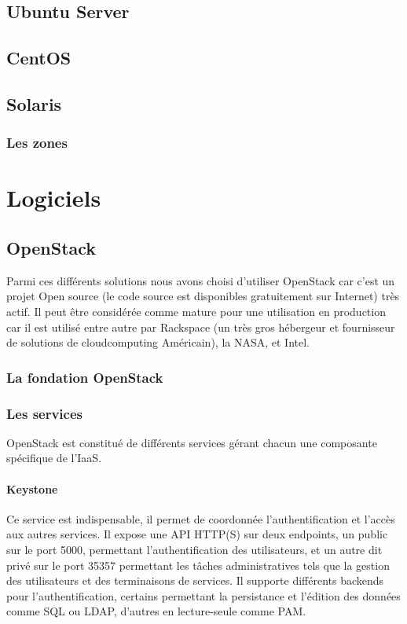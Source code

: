 \documentclass[a4paper,oneside]{report}
\begin{document}
\section{Ubuntu Server}

\section{CentOS}

\section{Solaris}

\subsection{Les zones}


\chapter{Logiciels}
\section{OpenStack}
Parmi ces différents solutions nous avons choisi d'utiliser OpenStack car c’est un projet Open source (le code source est disponibles gratuitement sur Internet) très actif.
Il peut être considérée comme mature pour une utilisation en production car il est utilisé entre autre par Rackspace (un très gros hébergeur et fournisseur de solutions de \gls{cloudcomputing} Américain), la NASA, et Intel.

\subsection{La fondation OpenStack}


\subsection{Les services}
OpenStack est constitué de différents services gérant chacun une composante spécifique de l'IaaS.
\subsubsection{Keystone}
Ce service est indispensable, il permet de coordonnée l'authentification et l'accès aux autres services.\newline
Il expose une API HTTP(S) sur deux endpoints, un public sur le port 5000, permettant l'authentification des utilisateurs, et un autre dit privé sur le port 35357 permettant les tâches administratives tels que la gestion des utilisateurs et des terminaisons de services.
Il supporte différents backends pour l'authentification, certains permettant la persistance et l'édition des données comme SQL ou LDAP, d'autres en lecture-seule comme PAM.\newline
\end{document}
